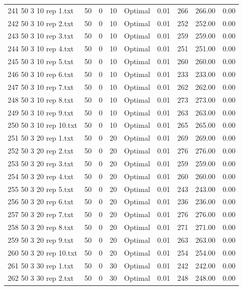 \begin{longtable}{lrrllrrrr}
241 50 3 10 rep 1.txt & 50 & 0 & 10 & Optimal &  0.01 & 266 & 266.00 &  0.00\\
242 50 3 10 rep 2.txt & 50 & 0 & 10 & Optimal &  0.01 & 252 & 252.00 &  0.00\\
243 50 3 10 rep 3.txt & 50 & 0 & 10 & Optimal &  0.01 & 259 & 259.00 &  0.00\\
244 50 3 10 rep 4.txt & 50 & 0 & 10 & Optimal &  0.01 & 251 & 251.00 &  0.00\\
245 50 3 10 rep 5.txt & 50 & 0 & 10 & Optimal &  0.01 & 260 & 260.00 &  0.00\\
246 50 3 10 rep 6.txt & 50 & 0 & 10 & Optimal &  0.01 & 233 & 233.00 &  0.00\\
247 50 3 10 rep 7.txt & 50 & 0 & 10 & Optimal &  0.01 & 262 & 262.00 &  0.00\\
248 50 3 10 rep 8.txt & 50 & 0 & 10 & Optimal &  0.01 & 273 & 273.00 &  0.00\\
249 50 3 10 rep 9.txt & 50 & 0 & 10 & Optimal &  0.01 & 263 & 263.00 &  0.00\\
250 50 3 10 rep 10.txt & 50 & 0 & 10 & Optimal &  0.01 & 265 & 265.00 &  0.00\\
251 50 3 20 rep 1.txt & 50 & 0 & 20 & Optimal &  0.01 & 269 & 269.00 &  0.00\\
252 50 3 20 rep 2.txt & 50 & 0 & 20 & Optimal &  0.01 & 276 & 276.00 &  0.00\\
253 50 3 20 rep 3.txt & 50 & 0 & 20 & Optimal &  0.01 & 259 & 259.00 &  0.00\\
254 50 3 20 rep 4.txt & 50 & 0 & 20 & Optimal &  0.01 & 260 & 260.00 &  0.00\\
255 50 3 20 rep 5.txt & 50 & 0 & 20 & Optimal &  0.01 & 243 & 243.00 &  0.00\\
256 50 3 20 rep 6.txt & 50 & 0 & 20 & Optimal &  0.01 & 236 & 236.00 &  0.00\\
257 50 3 20 rep 7.txt & 50 & 0 & 20 & Optimal &  0.01 & 276 & 276.00 &  0.00\\
258 50 3 20 rep 8.txt & 50 & 0 & 20 & Optimal &  0.01 & 271 & 271.00 &  0.00\\
259 50 3 20 rep 9.txt & 50 & 0 & 20 & Optimal &  0.01 & 263 & 263.00 &  0.00\\
260 50 3 20 rep 10.txt & 50 & 0 & 20 & Optimal &  0.01 & 254 & 254.00 &  0.00\\
261 50 3 30 rep 1.txt & 50 & 0 & 30 & Optimal &  0.01 & 242 & 242.00 &  0.00\\
262 50 3 30 rep 2.txt & 50 & 0 & 30 & Optimal &  0.01 & 248 & 248.00 &  0.00\\

\end{longtable}
